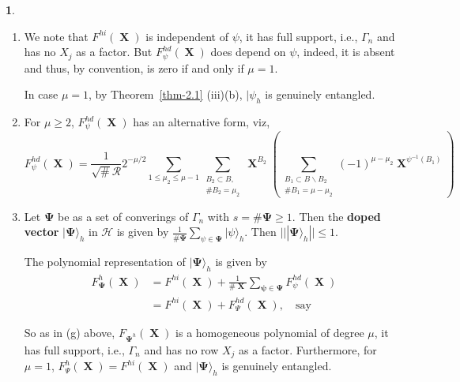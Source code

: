\documentclass[a4paper,12pt]{article}
\DeclareMathOperator{\x}{\mathrm{X}}
\theoremstyle{definition}
\theoremstyle{underlinethm}
\theoremstyle{definition}
\newtheorem{subsubsec}{}[subsection]
\begin{document}
\begin{subsubsec}
\begin{enumerate}[label=(\alph*)]
\item We note that $F^{hi}(\boldsymbol{\x})$ is independent of $\psi$, it has full support, i.e., $\Gamma_{n}$ and has no $X_{j}$ as a factor. But $F_{\psi}^{hd}(\boldsymbol{\x})$ does depend on $\psi$, indeed, it is absent and thus, by convention, is zero if and only if $\mu=1$.

In case $\mu =1$, by Theorem~\eqref{thm-2.1} (iii)(b), $| \psi_{h}$ is genuinely entangled.

\item For $\mu \geq 2$, $F_{\psi}^{hd}(\boldsymbol{\x})$ has an alternative form, viz, 
\begin{equation}
F_{\psi}^{hd} (\boldsymbol{\x}) = \frac{1}{ \sqrt{\#} \mathcal{R}} 2^{-\mu/2} \sum_{1 \leq \mu_{2} \leq \mu-1} \sum_{\substack{B_{2} \subset B,\\
\# B_{2} = \mu_{2}}} \boldsymbol{\x}^{B_{2}} \left(\sum_{\substack{B_{1} \subset B \smallsetminus B_{2} \\ \# B_{1} = \mu-\mu_{2}}} (-1)^{\mu-\mu_{2}} \boldsymbol{\x}^{\psi^{-1} (B_{1})}\right)\tag{3.76}\label{eq-3.76}
\end{equation}

\item Let $\boldsymbol{\Psi}$ be as a set of converings of $\Gamma_{n}$ with $s=\# \boldsymbol{\Psi} \geq 1$. Then the \textbf{doped vector} $| \boldsymbol{\Psi} \rangle_{h}$ in $\mathcal{H}$ is given by $\frac{1}{\# \boldsymbol{\Psi}} \sum_{\psi \in \boldsymbol{\Psi}} | \psi \rangle_{h}$. Then $|| | \boldsymbol{\Psi} \rangle_{h}|| \leq 1$.

The polynomial representation of $| \boldsymbol{\Psi}\rangle_{h}$ is given by
\begin{align*}
F_{\boldsymbol{\Psi}}^{h}(\boldsymbol{\x}) &= F^{hi}(\boldsymbol{\x}) + \frac{1}{\# \boldsymbol{\x}} \sum_{\boldsymbol{\boldsymbol{\psi} \in \boldsymbol{\Psi}}} F_{\psi}^{hd}(\boldsymbol{\x})\\
& = F^{hi}(\boldsymbol{\x}) + F_{\Psi}^{hd} (\boldsymbol{\x}),\quad \text{say}\tag{3.77}\label{eq-3.77}
\end{align*} 

So as in (g) above, $F_{\boldsymbol{\Psi}^{h}}(\boldsymbol{\x})$ is a homogeneous polynomial of degree $\mu$, it has full support, i.e., $\Gamma_{n}$ and has no row $X_{j}$ as a factor. Furthermore, for $\mu=1$, $F_{\Psi}^{h} (\boldsymbol{\x})= F^{hi}(\boldsymbol{\x})$ and $| \boldsymbol{\Psi} \rangle_{h}$ is genuinely entangled.
 

\end{enumerate}
\end{subsubsec}
\end{document}
